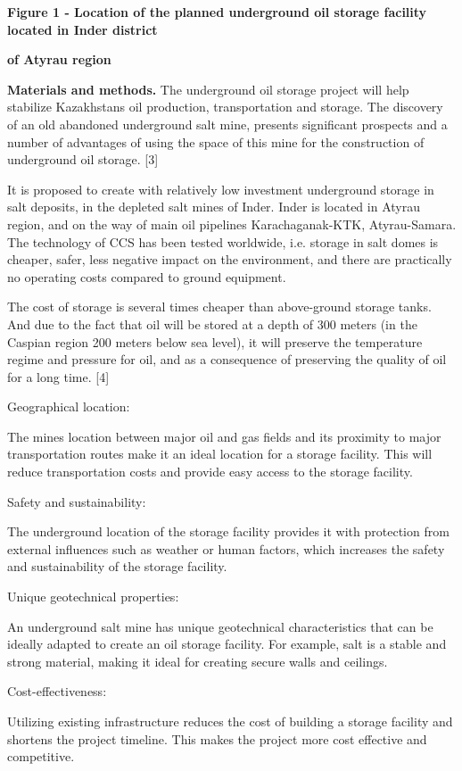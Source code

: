 {\bfseries Figure 1 - Location of the planned underground oil storage
facility located in Inder district}

{\bfseries of Atyrau region}

{\bfseries Materials and methods.} The underground oil storage project will
help stabilize Kazakhstan\textquotesingle s oil production,
transportation and storage. The discovery of an old abandoned
underground salt mine, presents significant prospects and a number of
advantages of using the space of this mine for the construction of
underground oil storage. {[}3{]}

It is proposed to create with relatively low investment underground
storage in salt deposits, in the depleted salt mines of Inder. Inder is
located in Atyrau region, and on the way of main oil pipelines
Karachaganak-KTK, Atyrau-Samara. The technology of CCS has been tested
worldwide, i.e. storage in salt domes is cheaper, safer, less negative
impact on the environment, and there are practically no operating costs
compared to ground equipment.

The cost of storage is several times cheaper than above-ground storage
tanks. And due to the fact that oil will be stored at a depth of 300
meters (in the Caspian region 200 meters below sea level), it will
preserve the temperature regime and pressure for oil, and as a
consequence of preserving the quality of oil for a long time. {[}4{]}

Geographical location:

The mine\textquotesingle s location between major oil and gas fields and
its proximity to major transportation routes make it an ideal location
for a storage facility. This will reduce transportation costs and
provide easy access to the storage facility.

Safety and sustainability:

The underground location of the storage facility provides it with
protection from external influences such as weather or human factors,
which increases the safety and sustainability of the storage facility.

Unique geotechnical properties:

An underground salt mine has unique geotechnical characteristics that
can be ideally adapted to create an oil storage facility. For example,
salt is a stable and strong material, making it ideal for creating
secure walls and ceilings.

Cost-effectiveness:

Utilizing existing infrastructure reduces the cost of building a storage
facility and shortens the project timeline. This makes the project more
cost effective and competitive.

